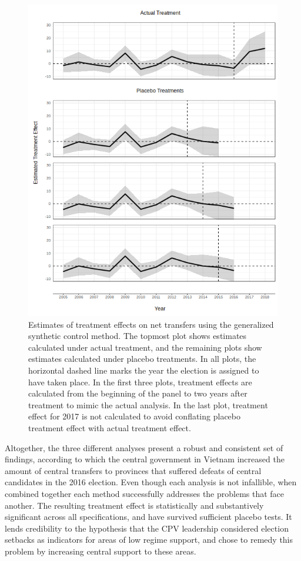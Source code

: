 \documentclass[12pt]{article}
\newcommand{\1}{\mathbbm{1}}
\begin{document}
\begin{figure}[!htbp]
	\centering
	\includegraphics[height=.75\textheight]{figure/190311_synth_results.png}
	\captionsetup{singlelinecheck=off}
	\caption[Estimated synthetic control treatment effects]{Estimates of treatment effects on net transfers using the generalized synthetic control method. The topmost plot shows estimates calculated under actual treatment, and the remaining plots show estimates calculated under placebo treatments. In all plots, the horizontal dashed line marks the year the election is assigned to have taken place. In the first three plots, treatment effects are calculated from the beginning of the panel to two years after treatment to mimic the actual analysis. In the last plot, treatment effect for 2017 is not calculated to avoid conflating placebo treatment effect with actual treatment effect.}
	\label{fig:synth_placebo}
\end{figure}

Altogether, the three different analyses present a robust and consistent set of findings, according to which the central government in Vietnam increased the amount of central transfers to provinces that suffered defeats of central candidates in the 2016 election. Even though each analysis is not infallible, when combined together each method successfully addresses the problems that face another. The resulting treatment effect is statistically and substantively significant across all specifications, and have survived sufficient placebo tests. It lends credibility to the hypothesis that the CPV leadership considered election setbacks as indicators for areas of low regime support, and chose to remedy this problem by increasing central support to these areas.
\end{document}
